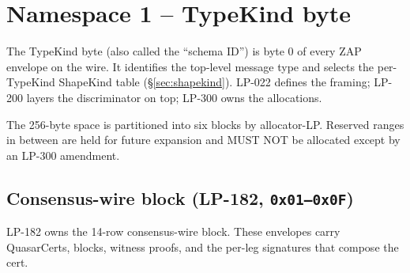 \section{Namespace 1 -- TypeKind byte}
\label{sec:typekind}

The TypeKind byte (also called the ``schema ID'') is byte 0 of every
ZAP envelope on the wire. It identifies the top-level message type
and selects the per-TypeKind ShapeKind table (\S\ref{sec:shapekind}).
LP-022 defines the framing; LP-200 layers the discriminator on top;
LP-300 owns the allocations.

The 256-byte space is partitioned into six blocks by allocator-LP.
Reserved ranges in between are held for future expansion and MUST
NOT be allocated except by an LP-300 amendment.

\subsection{Consensus-wire block (LP-182, \texttt{0x01--0x0F})}

LP-182 owns the 14-row consensus-wire block. These envelopes carry
QuasarCerts, blocks, witness proofs, and the per-leg signatures
that compose the cert.

